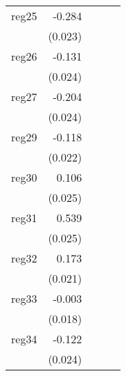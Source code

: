 {\begin{longtable}{l*{4}{D{.}{.}{-1}}}
\addlinespace
reg25       &      -0.284\sym{***}&                     &                     &                     \\
            &     (0.023)         &                     &                     &                     \\
\addlinespace
reg26       &      -0.131\sym{***}&                     &                     &                     \\
            &     (0.024)         &                     &                     &                     \\
\addlinespace
reg27       &      -0.204\sym{***}&                     &                     &                     \\
            &     (0.024)         &                     &                     &                     \\
\addlinespace
reg29       &      -0.118\sym{***}&                     &                     &                     \\
            &     (0.022)         &                     &                     &                     \\
\addlinespace
reg30       &       0.106\sym{***}&                     &                     &                     \\
            &     (0.025)         &                     &                     &                     \\
\addlinespace
reg31       &       0.539\sym{***}&                     &                     &                     \\
            &     (0.025)         &                     &                     &                     \\
\addlinespace
reg32       &       0.173\sym{***}&                     &                     &                     \\
            &     (0.021)         &                     &                     &                     \\
\addlinespace
reg33       &      -0.003         &                     &                     &                     \\
            &     (0.018)         &                     &                     &                     \\
\addlinespace
reg34       &      -0.122\sym{***}&                     &                     &                     \\
            &     (0.024)         &                     &                     &                     \\

\end{longtable}}

